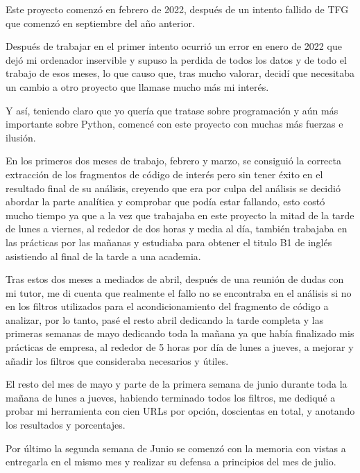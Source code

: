 \documentclass[a4paper, 12pt]{book}
\begin{document}
Este proyecto comenzó en febrero de 2022, después de un intento fallido de TFG que comenzó en septiembre del año anterior.

Después de trabajar en el primer intento ocurrió un error en enero de 2022 que dejó mi ordenador inservible y supuso la perdida de todos los datos y de todo el trabajo de esos meses, lo que causo que, tras mucho valorar, decidí que necesitaba un cambio a otro proyecto que llamase mucho más mi interés.

Y así, teniendo claro que yo quería que tratase sobre programación y aún más importante sobre Python, comencé con este proyecto con muchas más fuerzas e ilusión.

En los primeros dos meses de trabajo, febrero y marzo, se consiguió la correcta extracción de los fragmentos de código de interés pero sin tener éxito en el resultado final de su análisis, creyendo que era por culpa del análisis se decidió abordar la parte analítica y comprobar que podía estar fallando, esto costó mucho tiempo ya que a la vez que trabajaba en este proyecto la mitad de la tarde de lunes a viernes, al rededor de dos horas y media al día, también trabajaba en las prácticas por las mañanas y estudiaba para obtener el titulo B1 de inglés asistiendo al final de la tarde a una academia.

Tras estos dos meses a mediados de abril, después de una reunión de dudas con mi tutor, me di cuenta que realmente el fallo no se encontraba en el análisis si no en los filtros utilizados para el acondicionamiento del fragmento de código a analizar, por lo tanto, pasé el resto abril dedicando la tarde completa y las primeras semanas de mayo dedicando toda la mañana ya que había finalizado mis prácticas de empresa, al rededor de 5 horas por día de lunes a jueves, a mejorar y añadir los filtros que consideraba necesarios y útiles.

El resto del mes de mayo y parte de la primera semana de junio durante toda la mañana de lunes a jueves, habiendo terminado todos los filtros, me dediqué a probar mi herramienta con cien URLs por opción, doscientas en total, y anotando los resultados y porcentajes.

Por último la segunda semana de Junio se comenzó con la memoria con vistas a entregarla en el mismo mes y realizar su defensa a principios del mes de julio. 


\end{document}
